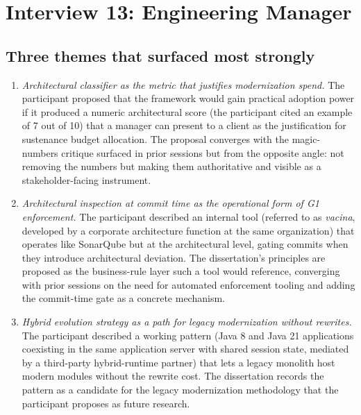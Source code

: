 
\section{Interview 13: Engineering Manager}
\label{sec:interview13}

\subsection*{Three themes that surfaced most strongly}

\begin{enumerate}[itemsep=8pt,topsep=2pt]
  \item \emph{Architectural classifier as the metric that justifies modernization spend.} The participant proposed that the framework would gain practical adoption power if it produced a numeric architectural score (the participant cited an example of 7 out of 10) that a manager can present to a client as the justification for sustenance budget allocation. The proposal converges with the magic-numbers critique surfaced in prior sessions but from the opposite angle: not removing the numbers but making them authoritative and visible as a stakeholder-facing instrument.

  \item \emph{Architectural inspection at commit time as the operational form of G1 enforcement.} The participant described an internal tool (referred to as \emph{vacina}, developed by a corporate architecture function at the same organization) that operates like SonarQube but at the architectural level, gating commits when they introduce architectural deviation. The dissertation's principles are proposed as the business-rule layer such a tool would reference, converging with prior sessions on the need for automated enforcement tooling and adding the commit-time gate as a concrete mechanism.

  \item \emph{Hybrid evolution strategy as a path for legacy modernization without rewrites.} The participant described a working pattern (Java 8 and Java 21 applications coexisting in the same application server with shared session state, mediated by a third-party hybrid-runtime partner) that lets a legacy monolith host modern modules without the rewrite cost. The dissertation records the pattern as a candidate for the legacy modernization methodology that the participant proposes as future research.
\end{enumerate}

